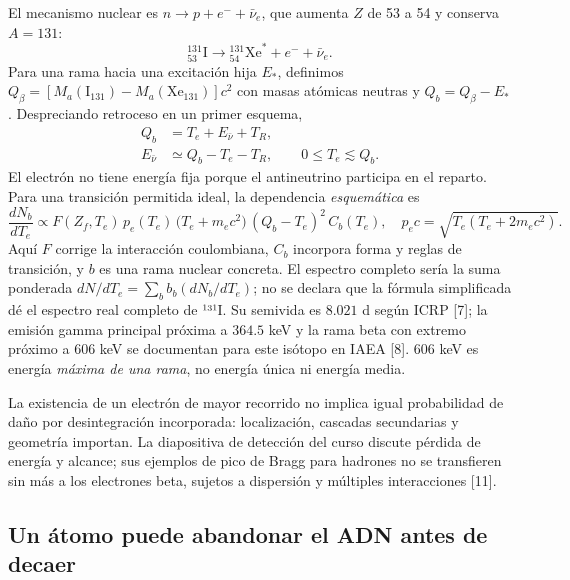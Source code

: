 \documentclass[11pt,a4paper,oneside]{article}
\begin{document}
El mecanismo nuclear es \(n\to p+e^-+\bar\nu_e\), que aumenta \(Z\) de 53 a 54 y conserva \(A=131\): \[{}^{131}_{53}\mathrm I\longrightarrow{}^{131}_{54}\mathrm{Xe}^*+e^-+\bar\nu_e .\] Para una rama hacia una excitación hija \(E_*\), definimos \(Q_\beta=[M_a(\mathrm{I}_{131})-M_a(\mathrm{Xe}_{131})]c^2\) con masas atómicas neutras y \(Q_b=Q_\beta-E_*\). Despreciando retroceso en un primer esquema, \[\begin{aligned}
Q_b&=T_e+E_{\bar\nu}+T_R,\\ E_{\bar\nu}&\simeq Q_b-T_e-T_R,\qquad 0\leq T_e\lesssim Q_b.
\end{aligned}\] El electrón no tiene energía fija porque el antineutrino participa en el reparto. Para una transición permitida ideal, la dependencia \emph{esquemática} es \[\frac{dN_b}{dT_e}\propto F(Z_f,T_e)\,p_e(T_e)\,\bigl(T_e+m_ec^2\bigr)\,(Q_b-T_e)^2\,C_b(T_e),\quad p_ec=\sqrt{T_e(T_e+2m_ec^2)}.\] Aquí \(F\) corrige la interacción coulombiana, \(C_b\) incorpora forma y reglas de transición, y \(b\) es una rama nuclear concreta. El espectro completo sería la suma ponderada \(dN/dT_e=\sum_b b_b(dN_b/dT_e)\); no se declara que la fórmula simplificada dé el espectro real completo de ¹³¹I. Su semivida es \(8.021\) d según ICRP {[}7{]}; la emisión gamma principal próxima a \(364.5\) keV y la rama beta con extremo próximo a \(606\) keV se documentan para este isótopo en IAEA {[}8{]}. \(606\) keV es energía \emph{máxima de una rama}, no energía única ni energía media.

La existencia de un electrón de mayor recorrido no implica igual probabilidad de daño por desintegración incorporada: localización, cascadas secundarias y geometría importan. La diapositiva de detección del curso discute pérdida de energía y alcance; sus ejemplos de pico de Bragg para hadrones no se transfieren sin más a los electrones beta, sujetos a dispersión y múltiples interacciones {[}11{]}.

\subsection{Un átomo puede abandonar el ADN antes de decaer}\label{un-uxe1tomo-puede-abandonar-el-adn-antes-de-decaer}
\end{document}
